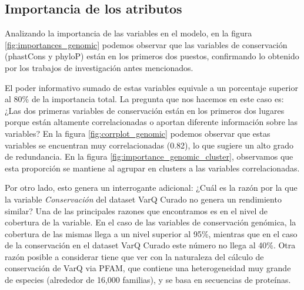 

\subsection{Importancia de los atributos}
Analizando la importancia de las variables en el modelo, en la figura \ref{fig:importances_genomic} podemos observar que las variables de conservación (phastCons y phyloP) están en los primeros dos puestos, confirmando lo obtenido por los trabajos de investigación antes mencionados. 

El poder informativo sumado de estas variables equivale a un porcentaje superior al 80\% de la importancia total. La pregunta que nos hacemos en este caso es: ¿Las dos primeras variables de conservación están en los primeros dos lugares porque están altamente correlacionadas o aportan diferente información sobre las variables? En la figura \ref{fig:corrplot_genomic} podemos observar que estas variables se encuentran muy correlacionadas (0.82), lo que sugiere un alto grado de redundancia. En la figura \ref{fig:importance_genomic_cluster}, observamos que esta proporción se mantiene al agrupar en clusters a las variables correlacionadas.

Por otro lado, esto genera un interrogante adicional: ¿Cuál es la razón por la que la variable \textit{Conservación} del dataset VarQ Curado no genera un rendimiento similar? Una de las principales razones que encontramos es en el nivel de cobertura de la variable. En el caso de las variables de conservación genómica, la cobertura de las mismas llega a un nivel superior al 95\%, mientras que en el caso de la conservación en el dataset VarQ Curado este número no llega al 40\%.  Otra razón posible a considerar tiene que ver con la naturaleza del cálculo de conservación de VarQ via PFAM, que contiene una heterogeneidad muy grande de especies (alrededor de 16,000 familias), y se basa en secuencias de proteínas.

